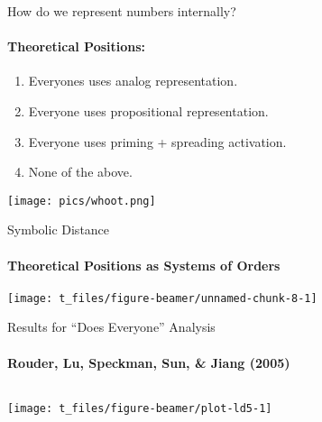 \documentclass[ignorenonframetext,t]{beamer}
\providecommand{\tightlist}{%
  \setlength{\itemsep}{0pt}\setlength{\parskip}{0pt}}
\begin{document}
\begin{frame}{How do we represent numbers internally?}

\framesubtitle{Theoretical Positions:}

\vspace*{.3cm}

\begin{enumerate}
\def\labelenumi{\arabic{enumi}.}
\tightlist
\item
  Everyones uses analog representation.
\item
  Everyone uses propositional representation.
\item
  Everyone uses priming + spreading activation.
\item
  None of the above.
\end{enumerate}

\vspace*{.2cm}

\centering \texttt{[image: pics/whoot.png]}

\end{frame}

\begin{frame}{Symbolic Distance}

\framesubtitle{Theoretical Positions as Systems of Orders}

\vspace*{.2cm}

\begin{center}\texttt{[image: t\_files/figure-beamer/unnamed-chunk-8-1]} \end{center}

\end{frame}

\begin{frame}{Results for ``Does Everyone'' Analysis}

\framesubtitle{Rouder, Lu, Speckman, Sun, \& Jiang (2005)}

\vspace*{.5cm}

\begin{columns}


\begin{center}\texttt{[image: t\_files/figure-beamer/plot-ld5-1]} \end{center}

\end{columns}

\end{frame}
\end{document}
